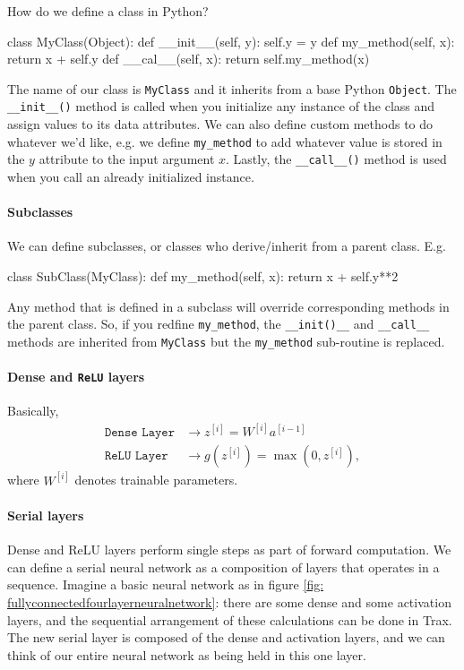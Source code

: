 \documentclass[12pt]{article}
\begin{document}
How do we define a class in Python?
\begin{python}
class MyClass(Object):
  def __init__(self, y):
    self.y = y
  def my_method(self, x):
    return x + self.y
  def __cal__(self, x):
    return self.my_method(x)  
\end{python}
The name of our class is \texttt{MyClass} and it inherits from a base Python \texttt{Object}. The \texttt{\_\_init\_\_()} method is called when you initialize any instance of the class and assign values to its data attributes. We can also define custom methods to do whatever we'd like, e.g. we define \texttt{my\_method} to add whatever value is stored in the $y$ attribute to the input argument $x$. Lastly, the \texttt{\_\_call\_\_()} method is used when you call an already initialized instance.

\paragraph{Subclasses} We can define subclasses, or classes who derive/inherit from a parent class. E.g.
\begin{python}
class SubClass(MyClass):
  def my_method(self, x):
    return x + self.y**2
\end{python}
Any method that is defined in a subclass will override corresponding methods in the parent class. So, if you redfine \texttt{my\_method}, the \texttt{\_\_init()\_\_} and \texttt{\_\_call\_\_} methods are inherited from \texttt{MyClass} but the \texttt{my\_method} sub-routine is replaced.

\paragraph{Dense and \texttt{ReLU} layers}
Basically,
\begin{align*}
  \texttt{Dense Layer} &\longrightarrow z^{[i]} = W^{[i]} a^{[i-1]} \\
  \texttt{ReLU Layer} &\longrightarrow g(z^{[i]}) = \max(0, z^{[i]}),
\end{align*}
where $W^{[i]}$ denotes trainable parameters.

\paragraph{Serial layers} Dense and ReLU layers perform single steps as part of forward computation. We can define a serial neural network as a composition of layers that operates in a sequence. Imagine a basic neural network as in figure \ref{fig: fullyconnectedfourlayerneuralnetwork}: there are some dense and some activation layers, and the sequential arrangement of these calculations can be done in Trax. The new serial layer is composed of the dense and activation layers, and we can think of our entire neural network as being held in this one layer.
\end{document}
